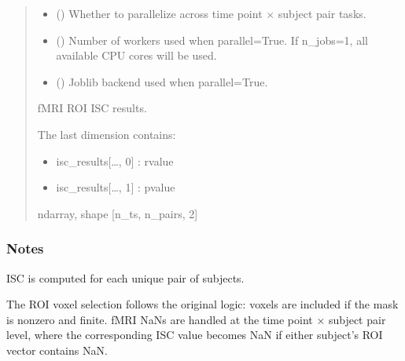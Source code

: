 \documentclass[letterpaper,10pt,english]{sphinxhowto}
\begin{document}
\begin{fulllineitems}
\begin{quote}
\begin{description}
\begin{itemize}
\item {} 
\sphinxAtStartPar
{} (\sphinxstyleliteralemphasis{\sphinxupquote{, }}) \textendash{} Whether to parallelize across time point × subject pair tasks.

\item {} 
\sphinxAtStartPar
{} (\sphinxstyleliteralemphasis{\sphinxupquote{, }}) \textendash{} Number of workers used when parallel=True.
If n\_jobs=\sphinxhyphen{}1, all available CPU cores will be used.

\item {} 
\sphinxAtStartPar
{} (\sphinxstyleliteralemphasis{\sphinxupquote{, }}\sphinxstyleliteralemphasis{\sphinxupquote{, }}) \textendash{} Joblib backend used when parallel=True.

\end{itemize}

\sphinxAtStartPar

\sphinxAtStartPar
{} \textendash{} fMRI ROI ISC results.

\sphinxAtStartPar
The last dimension contains:
\begin{itemize}
\item {} 
\sphinxAtStartPar
isc\_results{[}…, 0{]} : r\sphinxhyphen{}value

\item {} 
\sphinxAtStartPar
isc\_results{[}…, 1{]} : p\sphinxhyphen{}value

\end{itemize}


\sphinxAtStartPar
ndarray, shape {[}n\_ts, n\_pairs, 2{]}

\end{description}\end{quote}
\subsubsection*{Notes}

\sphinxAtStartPar
ISC is computed for each unique pair of subjects.

\sphinxAtStartPar
The ROI voxel selection follows the original logic: voxels are included
if the mask is non\sphinxhyphen{}zero and finite. fMRI NaNs are handled at the
time point × subject pair level, where the corresponding ISC value
becomes NaN if either subject’s ROI vector contains NaN.

\end{fulllineitems}
\end{document}
